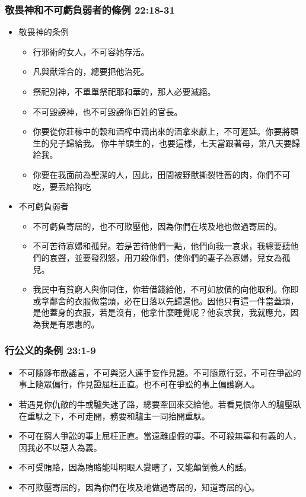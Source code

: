\subsubsection{敬畏神和不可虧負弱者的條例 22:18-31}
\begin{itemize} 
\itemsep-.35em
\item 敬畏神的条例
\begin{itemize} 
\itemsep-.35em
\item 行邪術的女人，不可容她存活。
\item 凡與獸淫合的，總要把他治死。
\item 祭祀別神，不單單祭祀耶和華的，那人必要滅絕。
\item 不可毀謗神，也不可毀謗你百姓的官長。
\item 你要從你莊稼中的穀和酒榨中滴出來的酒拿來獻上，不可遲延。你要將頭生的兒子歸給我。 你牛羊頭生的，也要這樣，七天當跟著母，第八天要歸給我。
\item 你要在我面前為聖潔的人，因此，田間被野獸撕裂牲畜的肉，你們不可吃，要丟給狗吃
\end{itemize}
\item 不可虧負弱者
\begin{itemize} 
\itemsep-.35em
\item 不可虧負寄居的，也不可欺壓他，因為你們在埃及地也做過寄居的。
\item 不可苦待寡婦和孤兒。若是苦待他們一點，他們向我一哀求，我總要聽他們的哀聲，並要發烈怒，用刀殺你們，使你們的妻子為寡婦，兒女為孤兒。
\item 我民中有貧窮人與你同住，你若借錢給他，不可如放債的向他取利。你即或拿鄰舍的衣服做當頭，必在日落以先歸還他。因他只有這一件當蓋頭，是他蓋身的衣服，若是沒有，他拿什麼睡覺呢？他哀求我，我就應允，因為我是有恩惠的。
\end{itemize}
\end{itemize}


\subsubsection{行公义的条例 23:1-9}
\begin{itemize} 
\itemsep-.35em
\item 不可隨夥布散謠言，不可與惡人連手妄作見證。不可隨眾行惡，不可在爭訟的事上隨眾偏行，作見證屈枉正直。也不可在爭訟的事上偏護窮人。
\item 若遇見你仇敵的牛或驢失迷了路，總要牽回來交給他。若看見恨你人的驢壓臥在重馱之下，不可走開，務要和驢主一同抬開重馱。
\item 不可在窮人爭訟的事上屈枉正直。當遠離虛假的事。不可殺無辜和有義的人，因我必不以惡人為義。
\item 不可受賄賂，因為賄賂能叫明眼人變瞎了，又能顛倒義人的話。
\item 不可欺壓寄居的，因為你們在埃及地做過寄居的，知道寄居的心。
\end{itemize}


